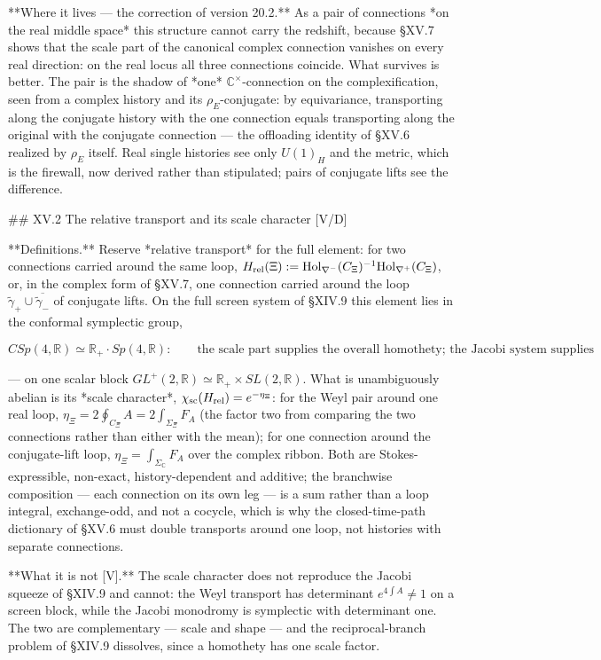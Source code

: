 **Where it lives — the correction of version 20.2.** As a pair of connections *on the real middle space* this structure cannot carry the redshift, because §XV.7 shows that the scale part of the canonical complex connection vanishes on every real direction: on the real locus all three connections coincide. What survives is better. The pair is the shadow of *one* $\mathbb C^\times$-connection on the complexification, seen from a complex history and its $\rho_E$-conjugate: by equivariance, transporting along the conjugate history with the one connection equals transporting along the original with the conjugate connection — the offloading identity of §XV.6 realized by $\rho_E$ itself. Real single histories see only $U(1)_H$ and the metric, which is the firewall, now derived rather than stipulated; pairs of conjugate lifts see the difference.

## XV.2 The relative transport and its scale character [V/D]

**Definitions.** Reserve *relative transport* for the full element: for two connections carried around the same loop, $H_{\rm rel}(\Xi) := {\rm Hol}_{\nabla^-}(C_\Xi)^{-1}{\rm Hol}_{\nabla^+}(C_\Xi)$, or, in the complex form of §XV.7, one connection carried around the loop $\widetilde\gamma_+\cup\overline{\widetilde\gamma_-}$ of conjugate lifts. On the full screen system of §XIV.9 this element lies in the conformal symplectic group,

$$CSp(4,\mathbb R)\simeq\mathbb R_+\cdot Sp(4,\mathbb R):\qquad \text{the scale part supplies the overall homothety; the Jacobi system supplies focusing, shear, squeeze and rotation}$$

— on one scalar block $GL^+(2,\mathbb R)\simeq\mathbb R_+\times SL(2,\mathbb R)$. What is unambiguously abelian is its *scale character*, $\chi_{\rm sc}(H_{\rm rel}) = e^{-\eta_\Xi}$: for the Weyl pair around one real loop, $\eta_\Xi = 2\oint_{C_\Xi}A = 2\int_{\Sigma_\Xi}F_A$ (the factor two from comparing the two connections rather than either with the mean); for one connection around the conjugate-lift loop, $\eta_\Xi = \int_{\Sigma_{\mathbb C} }F_A$ over the complex ribbon. Both are Stokes-expressible, non-exact, history-dependent and additive; the branchwise composition — each connection on its own leg — is a sum rather than a loop integral, exchange-odd, and not a cocycle, which is why the closed-time-path dictionary of §XV.6 must double transports around one loop, not histories with separate connections.

**What it is not [V].** The scale character does not reproduce the Jacobi squeeze of §XIV.9 and cannot: the Weyl transport has determinant $e^{4\int A}\neq1$ on a screen block, while the Jacobi monodromy is symplectic with determinant one. The two are complementary — scale and shape — and the reciprocal-branch problem of §XIV.9 dissolves, since a homothety has one scale factor.

